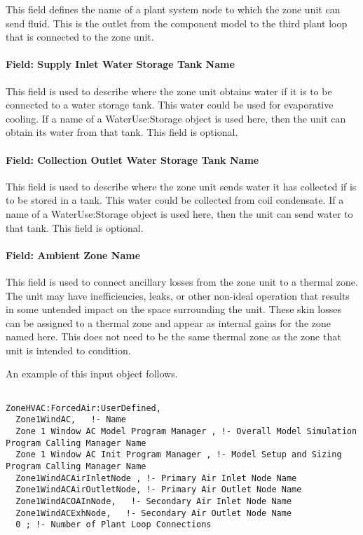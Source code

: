 This field defines the name of a plant system node to which the zone unit can send fluid. This is the outlet from the component model to the third plant loop that is connected to the zone unit.

\paragraph{Field: Supply Inlet Water Storage Tank Name}\label{field-supply-inlet-water-storage-tank-name}

This field is used to describe where the zone unit obtains water if it is to be connected to a water storage tank. This water could be used for evaporative cooling. If a name of a WaterUse:Storage object is used here, then the unit can obtain its water from that tank. This field is optional.

\paragraph{Field: Collection Outlet Water Storage Tank Name}\label{field-collection-outlet-water-storage-tank-name}

This field is used to describe where the zone unit sends water it has collected if is to be stored in a tank. This water could be collected from coil condensate. If a name of a WaterUse:Storage object is used here, then the unit can send water to that tank. This field is optional.

\paragraph{Field: Ambient Zone Name}\label{field-ambient-zone-name}

This field is used to connect ancillary losses from the zone unit to a thermal zone. The unit may have inefficiencies, leaks, or other non-ideal operation that results in some untended impact on the space surrounding the unit. These skin losses can be assigned to a thermal zone and appear as internal gains for the zone named here. This does not need to be the same thermal zone as the zone that unit is intended to condition.

An example of this input object follows.

\begin{lstlisting}

ZoneHVAC:ForcedAir:UserDefined,
  Zone1WindAC,   !- Name
  Zone 1 Window AC Model Program Manager , !- Overall Model Simulation Program Calling Manager Name
  Zone 1 Window AC Init Program Manager , !- Model Setup and Sizing Program Calling Manager Name
  Zone1WindACAirInletNode , !- Primary Air Inlet Node Name
  Zone1WindACAirOutletNode, !- Primary Air Outlet Node Name
  Zone1WindACOAInNode,   !- Secondary Air Inlet Node Name
  Zone1WindACExhNode,   !- Secondary Air Outlet Node Name
  0 ; !- Number of Plant Loop Connections
\end{lstlisting}

